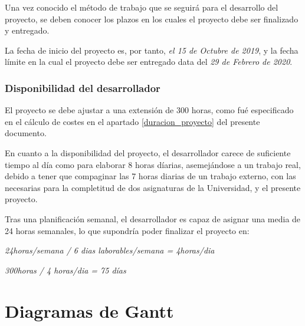 \label{planificacion}

Una vez conocido el método de trabajo que se seguirá para el desarrollo del proyecto, se deben conocer los plazos en los cuales el proyecto debe ser finalizado y entregado.

La fecha de inicio del proyecto es, por tanto, \textit{el 15 de Octubre de 2019}, y la fecha límite en la cual el proyecto debe ser entregado data del \textit{29 de Febrero de 2020}.

\subsubsection{Disponibilidad del desarrollador}

El proyecto se debe ajustar a una extensión de 300 horas, como fué especificado en el cálculo de costes en el apartado \ref{duracion_proyecto} del presente documento.

En cuanto a la disponibilidad del proyecto, el desarrollador carece de suficiente tiempo  al día como para elaborar 8 horas díarias, asemejándose a un trabajo real, debido a tener que compaginar las 7 horas diarias de un trabajo externo, con las necesarias para la completitud de dos asignaturas de la Universidad, y el presente proyecto.

Tras una planificación semanal, el desarrollador es capaz de asignar una media de 24 horas semanales, lo que supondría poder finalizar el proyecto en:

\begin{center}
    \textit{24horas/semana / 6 dias laborables/semana = 4horas/dia }
    
    \textit{300horas / 4 horas/dia = 75 días }  

\end{center}

\newpage
\section{Diagramas de Gantt}

